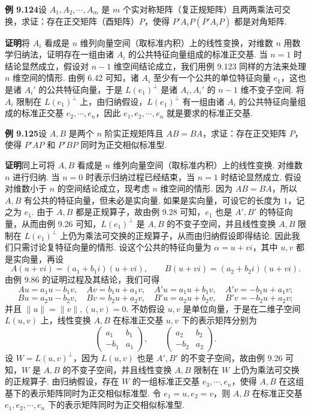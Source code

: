 \documentclass[UTF8, 12pt, fontset=fandol, oneside]{ctexart}
\begin{document}
\noindent\textbf{例 9.124}\quad 设 $A_1,A_2,\cdots,A_m$ 是 $m$ 个实对称矩阵（复正规矩阵）且两两乘法可交换，求证：存在正交矩阵（酉矩阵）$P$，使得 $P'A_iP(\overline{P}'A_iP)$ 都是对角矩阵.

\noindent\textbf{证明}\quad 将 $A_i$ 看成是 $n$ 维列向量空间（取标准内积）上的线性变换，对维数 $n$ 用数学归纳法，证明存在一组由诸 $A_i$ 的公共特征向量组成的标准正交基. 当 $n=1$ 时结论显然成立，假设对 $n-1$ 维空间结论成立，我们用例 9.123 同样的方法来处理 $n$ 维空间的情形. 由例 6.42 可知，诸 $A_i$ 至少有一个公共的单位特征向量 $e_1$，这也是诸 $A_i'$ 的公共特征向量，于是 $L(e_1)^\perp$ 是诸 $A_i,A_i'$ 的 $n-1$ 维不变子空间. 将 $A_i$ 限制在 $L(e_1)^\perp$ 上，由归纳假设，$L(e_1)^\perp$ 有一组由诸 $A_i$ 的公共特征向量组成的标准正交基 $e_2,\cdots,e_n$，因此 $e_1,e_2,\cdots,e_n$ 就是要求的标准正交基.

\noindent\textbf{例 9.125}\quad 设 $A,B$ 是两个 $n$ 阶实正规矩阵且 $AB=BA$，求证：存在正交矩阵 $P$，使得 $P'AP$ 和 $P'BP$ 同时为正交相似标准型.

\noindent\textbf{证明}\quad 同上可将 $A,B$ 看成是 $n$ 维列向量空间（取标准内积）上的线性变换. 对维数 $n$ 进行归纳. 当 $n=0$ 时表示归纳过程已经结束，当 $n=1$ 时结论显然成立. 假设对维数小于 $n$ 的空间结论成立，现考虑 $n$ 维空间的情形. 因为 $AB=BA$，所以 $A,B$ 有公共的特征向量，但未必是实向量. 如果是实向量，可设它的长度为 $1$，记之为 $e_1$. 由于 $A,B$ 都是正规算子，故由例 9.28 可知，$e_1$ 也是 $A',B'$ 的特征向量，从而由例 9.26 可知，$L(e_1)^\perp$ 是 $A,B$ 的不变子空间，并且线性变换 $A,B$ 限制在 $L(e_1)^\perp$ 上仍为乘法可交换的正规算子，从而由归纳假设即得结论. 因此我们只需讨论复特征向量的情形. 设这个公共的特征向量为 $\alpha=u+vi$，其中 $u,v$ 都是实向量，再设
\[
A(u+vi)=(a_1+b_1i)(u+vi),\qquad B(u+vi)=(a_2+b_2i)(u+vi).
\]
由例 9.86 的证明过程及其结论，我们可得
\[
Au=a_1u-b_1v,\quad Av=b_1u+a_1v,\quad A'u=a_1u+b_1v,\quad A'v=-b_1u+a_1v;
\]
\[
Bu=a_2u-b_2v,\quad Bv=b_2u+a_2v,\quad B'u=a_2u+b_2v,\quad B'v=-b_2u+a_2v;
\]
并且 $\|u\|=\|v\|,(u,v)=0$. 不妨假设 $u,v$ 是单位向量，于是在二维子空间 $L(u,v)$ 上，线性变换 $A,B$ 在标准正交基 $u,v$ 下的表示矩阵分别为
\[
\begin{pmatrix}
a_1&b_1\\
-b_1&a_1
\end{pmatrix},\qquad
\begin{pmatrix}
a_2&b_2\\
-b_2&a_2
\end{pmatrix}.
\]
设 $W=L(u,v)^\perp$，因为 $L(u,v)$ 也是 $A',B'$ 的不变子空间，故由例 9.26 可知，$W$ 是 $A,B$ 的不变子空间，并且线性变换 $A,B$ 限制在 $W$ 上仍为乘法可交换的正规算子. 由归纳假设，存在 $W$ 的一组标准正交基 $e_3,\cdots,e_n$，使得 $A,B$ 在这组基下的表示矩阵同时为正交相似标准型. 令 $e_1=u,e_2=v$，则 $A,B$ 在标准正交基 $e_1,e_2,\cdots,e_n$ 下的表示矩阵同时为正交相似标准型.
\end{document}
